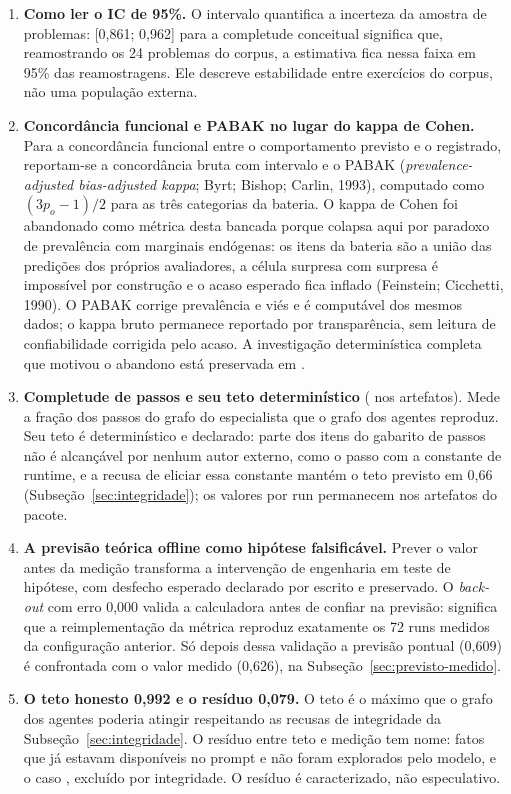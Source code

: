\documentclass[11pt,a4paper]{article}
\begin{document}
\begin{enumerate}
  \item \textbf{Como ler o IC de 95\%.} O intervalo quantifica a incerteza da amostra de problemas: [0,861; 0,962] para a completude conceitual significa que, reamostrando os 24 problemas do corpus, a estimativa fica nessa faixa em 95\% das reamostragens. Ele descreve estabilidade entre exercícios do corpus, não uma população externa.
  \item \textbf{Concordância funcional e PABAK no lugar do kappa de Cohen.} Para a concordância funcional entre o comportamento previsto e o registrado, reportam-se a concordância bruta com intervalo e o PABAK (\emph{prevalence-adjusted bias-adjusted kappa}; Byrt; Bishop; Carlin, 1993), computado como $(3p_o-1)/2$ para as três categorias da bateria. O kappa de Cohen foi abandonado como métrica desta bancada porque colapsa aqui por paradoxo de prevalência com marginais endógenas: os itens da bateria são a união das predições dos próprios avaliadores, a célula surpresa com surpresa é impossível por construção e o acaso esperado fica inflado (Feinstein; Cicchetti, 1990). O PABAK corrige prevalência e viés e é computável dos mesmos dados; o kappa bruto permanece reportado por transparência, sem leitura de confiabilidade corrigida pelo acaso. A investigação determinística completa que motivou o abandono está preservada em .
  \item \textbf{Completude de passos e seu teto determinístico} ( nos artefatos). Mede a fração dos passos do grafo do especialista que o grafo dos agentes reproduz. Seu teto é determinístico e declarado: parte dos itens do gabarito de passos não é alcançável por nenhum autor externo, como o passo  com a constante de runtime, e a recusa de eliciar essa constante mantém o teto previsto em 0,66 (Subseção~\ref{sec:integridade}); os valores por run permanecem nos artefatos do pacote.
  \item \textbf{A previsão teórica offline como hipótese falsificável.} Prever o valor antes da medição transforma a intervenção de engenharia em teste de hipótese, com desfecho esperado declarado por escrito e preservado. O \emph{back-out} com erro 0,000 valida a calculadora antes de confiar na previsão: significa que a reimplementação da métrica reproduz exatamente os 72 runs medidos da configuração anterior. Só depois dessa validação a previsão pontual (0,609) é confrontada com o valor medido (0,626), na Subseção~\ref{sec:previsto-medido}.
  \item \textbf{O teto honesto 0,992 e o resíduo 0,079.} O teto é o máximo que o grafo dos agentes poderia atingir respeitando as recusas de integridade da Subseção~\ref{sec:integridade}. O resíduo entre teto e medição tem nome: fatos que já estavam disponíveis no prompt e não foram explorados pelo modelo, e o caso , excluído por integridade. O resíduo é caracterizado, não especulativo.
\end{enumerate}
\end{document}
